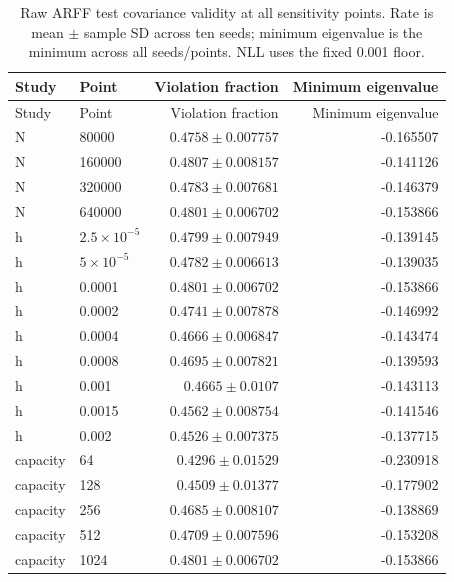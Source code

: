\begin{longtable}{llrr}\caption{Raw ARFF test covariance validity at all sensitivity points. Rate is mean $\pm$ sample SD across ten seeds; minimum eigenvalue is the minimum across all seeds/points. NLL uses the fixed 0.001 floor.}\\\toprule Study & Point & Violation fraction & Minimum eigenvalue\\\midrule\endfirsthead\toprule Study & Point & Violation fraction & Minimum eigenvalue\\\midrule\endhead
N & 80000 & $0.4758\pm 0.007757$ & -0.165507\\
N & 160000 & $0.4807\pm 0.008157$ & -0.141126\\
N & 320000 & $0.4783\pm 0.007681$ & -0.146379\\
N & 640000 & $0.4801\pm 0.006702$ & -0.153866\\
h & $2.5\times10^{-5}$ & $0.4799\pm 0.007949$ & -0.139145\\
h & $5\times10^{-5}$ & $0.4782\pm 0.006613$ & -0.139035\\
h & 0.0001 & $0.4801\pm 0.006702$ & -0.153866\\
h & 0.0002 & $0.4741\pm 0.007878$ & -0.146992\\
h & 0.0004 & $0.4666\pm 0.006847$ & -0.143474\\
h & 0.0008 & $0.4695\pm 0.007821$ & -0.139593\\
h & 0.001 & $0.4665\pm 0.0107$ & -0.143113\\
h & 0.0015 & $0.4562\pm 0.008754$ & -0.141546\\
h & 0.002 & $0.4526\pm 0.007375$ & -0.137715\\
capacity & 64 & $0.4296\pm 0.01529$ & -0.230918\\
capacity & 128 & $0.4509\pm 0.01377$ & -0.177902\\
capacity & 256 & $0.4685\pm 0.008107$ & -0.138869\\
capacity & 512 & $0.4709\pm 0.007596$ & -0.153208\\
capacity & 1024 & $0.4801\pm 0.006702$ & -0.153866\\
\bottomrule\end{longtable}
